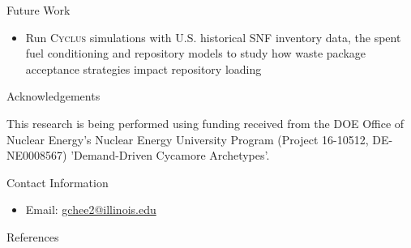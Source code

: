 \documentclass[final]{beamer}
\newlength{\onecolwid}
\newlength{\threecolwid}
\newcommand{\Cyclus}{\textsc{Cyclus}\xspace}%
\begin{document}
\begin{frame}[t]
\begin{columns}[t,totalwidth=\threecolwid]
\begin{column}{\onecolwid}
\begin{alertblock}{Future Work }
\begin{itemize}
		\item Run \Cyclus simulations with U.S. historical SNF inventory data, the spent fuel conditioning 
		and repository models to study how waste package acceptance strategies impact repository loading
\end{itemize}

\end{alertblock}




\begin{block}{Acknowledgements}
	
	This research is being performed using funding received from 
	the DOE Office of Nuclear Energy's Nuclear Energy University 
	Program (Project 16-10512, DE-NE0008567) 'Demand-Driven Cycamore 
	Archetypes'.
	
	
\end{block}



\begin{alertblock}{Contact Information}
	\begin{itemize}
		\item Email: \href{mailto:gchee2@illinois.edu}{gchee2@illinois.edu}
	\end{itemize}
	
\end{alertblock}

\begin{block}{References}


\end{block}
\end{column}
\end{columns}
\end{frame}
\end{document}
